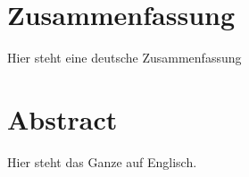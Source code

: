\section*{Zusammenfassung}
Hier steht eine deutsche Zusammenfassung
\section*{Abstract}
Hier steht das Ganze auf Englisch.